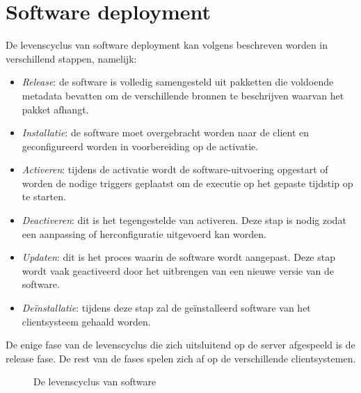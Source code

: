 \section{Software deployment}\label{sec:softwareLevenscyclus}
De levenscyclus van software deployment kan volgens \citet{softwareDeployment,hall1999cooperative} beschreven worden in verschillend stappen, namelijk:
\begin{itemize}
\item \emph{Release}: de software is volledig samengesteld uit pakketten die voldoende metadata bevatten om de verschillende bronnen te beschrijven waarvan het pakket afhangt.
\item \emph{Installatie}: de software moet overgebracht worden naar de client en geconfigureerd worden in voorbereiding op de activatie.
\item \emph{Activeren}: tijdens de activatie wordt de software-uitvoering opgestart of worden de nodige triggers geplaatst om de executie op het gepaste tijdstip op te starten.
\item \emph{Deactiveren}: dit is het tegengestelde van activeren. Deze stap is nodig zodat een aanpassing of herconfiguratie uitgevoerd kan worden.
\item \emph{Updaten}: dit is het proces waarin de software wordt aangepast. Deze stap wordt vaak geactiveerd door het uitbrengen van een nieuwe versie van de software.
\item \emph{Deïnstallatie}: tijdens deze stap zal de geïnstalleerd software van het clientsysteem gehaald worden.
\end{itemize}
De enige fase van de levenscyclus die zich uitsluitend op de server afgespeeld is de release fase.
De rest van de fases spelen zich af op de verschillende clientsystemen.

\begin{figure}[!ht]
\centering
{}
\caption{De levenscyclus van software \citep{carzaniga1998characterization}}
\label{fig:softwareLevenscyclus}
\end{figure}

